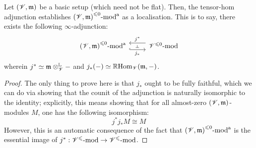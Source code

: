                 \begin{proposition} \label{prop: localising_at_almost_modules}
                    Let $(\mathscr{V}, \mathfrak{m})$ be a basic setup (which need not be flat). Then, the tensor-hom adjunction establishes ${(\mathscr{V}, \mathfrak{m})}^{\leqslant 0}\text{-}\mathrm{mod}^{\mathrm{a}}$ as a localisation. This is to say, there exists the following $\infty$-adjunction:
                        $$
                            \begin{tikzcd}
                            	{{(\scrV, \m)}^{\leq 0}\mod^{\almost}} & {{\scrV}^{\leq 0}\mod}
                            	\arrow[""{name=0, anchor=center, inner sep=0}, "{j_*}"', shift right=2, hook, from=1-1, to=1-2]
                            	\arrow[""{name=1, anchor=center, inner sep=0}, "{j^*}"', shift right=2, from=1-2, to=1-1]
                            	\arrow["\dashv"{anchor=center, rotate=-90}, draw=none, from=1, to=0]
                            \end{tikzcd}
                        $$
                    wherein $j^* \cong \m \tensor_{\scrV}^{\L} -$ and $j_*(-) \simeq \mathbb{R}\mathrm{Hom}_{\mathscr{V}}(\mathfrak{m}, -)$.
                \end{proposition}
                    \begin{proof}
                        The only thing to prove here is that $j_*$ ought to be fully faithful, which we can do via showing that the counit of the adjunction is naturally isomorphic to the identity; explicitly, this means showing that for all almost-zero $(\mathscr{V}, \mathfrak{m})$-modules $M$, one has the following isomorphism:
                            $$j^* j_* M \cong M$$
                        However, this is an automatic consequence of the fact that ${(\mathscr{V}, \mathfrak{m})}^{\leqslant 0}\text{-}\mathrm{mod}^{\mathrm{a}}$ is the essential image of $j^*: {\mathscr{V}}^{\leqslant}\text{-}\mathrm{mod} \to {\mathscr{V}}^{\leqslant}\text{-}\mathrm{mod}$.
                    \end{proof}
                
